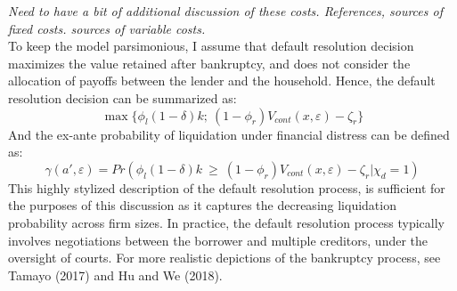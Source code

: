 \documentclass[12pt]{article}
\begin{document}
\textit{Need to have a bit of additional discussion of these costs. References, sources of fixed costs. sources of variable costs. } \\
To keep the model parsimonious, I assume that default resolution decision maximizes the value retained after bankruptcy, and does not consider the allocation of payoffs between the lender and the household. Hence, the default resolution decision can be summarized as: 
\begin{equation} \label{eq:liquidation decision}
    \max \{ \phi_l (1-\delta) k; \ (1-\phi_r) V_{cont}(x,\varepsilon)- \zeta_r  \}
\end{equation}
And the ex-ante probability of liquidation under financial distress can be defined as: 
\begin{equation} \label{eq:liquidation probability}
    \gamma(a', \varepsilon) = Pr(\phi_l (1-\delta) k \ \geq \ (1-\phi_r) V_{cont}(x,\varepsilon) - \zeta_r | \chi_d = 1)
\end{equation} 
This highly stylized description of the default resolution process, is sufficient for the purposes of this discussion as it captures the decreasing liquidation probability across firm sizes. In practice, the default resolution process typically involves negotiations between the borrower and multiple creditors, under the oversight of courts. For more realistic depictions of the bankruptcy process, see Tamayo (2017) and Hu and We (2018).  

 
\end{document}
